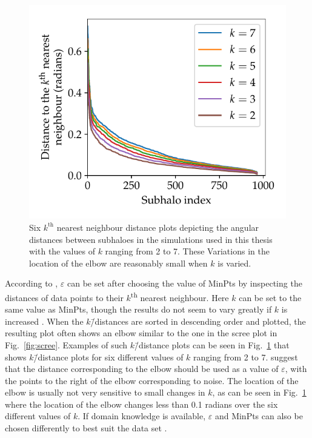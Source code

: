 \documentclass[english, twoside]{HYgradu}
\begin{document}
\begin{figure}
    \centering
    \includegraphics{kuvat/k-distances-singlesim.pdf}
    \caption{Six $k^{\text{th}}$ nearest neighbour distance plots depicting the angular distances between subhaloes in the simulations used in this thesis with the values of $k$ ranging from 2 to 7. These  Variations in the location of the elbow are reasonably small when $k$ is varied.}\label{fig:k-distances-singlesim}
\end{figure}

According to \citet{ester1996density}, $\varepsilon$ can be set after choosing the value of MinPts by inspecting the distances of data points to their $k$\textsuperscript{th} nearest neighbour. Here $k$ can be set to the same value as MinPts, though the results do not seem to vary greatly if $k$ is increased \citep{ester1996density}. When the $k$\=/distances are sorted in descending order and plotted, the resulting plot often shows an elbow similar to the one in the scree plot in Fig.\ \ref{fig:scree}. Examples of such $k$\=/distance plots can be seen in Fig.\ \ref{fig:k-distances-singlesim} that shows $k$\=/distance plots for six different values of $k$ ranging from 2 to 7. \citet{ester1996density} suggest that the distance corresponding to the elbow should be used as a value of $\varepsilon$, with the points to the right of the elbow corresponding to noise. The location of the elbow is usually not very sensitive to small changes in $k$, as can be seen in Fig.\ \ref{fig:k-distances-singlesim} where the location of the elbow changes less than 0.1 radians over the six different values of $k$. If domain knowledge is available, $\varepsilon$ and MinPts can also be chosen differently to best suit the data set \citep{schubert2017dbscan}.
\end{document}

